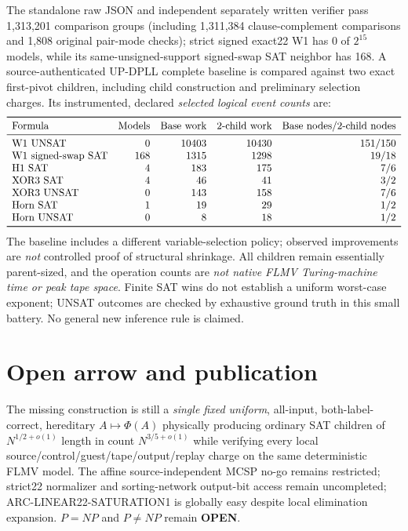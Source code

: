 \documentclass[11pt]{article}
\newcommand{\OPEN}{\textbf{OPEN}}
\begin{document}
The standalone raw JSON and independent separately written verifier pass 1,313,201 comparison groups (including 1,311,384 clause-complement comparisons and 1,808 original pair-mode checks); strict signed exact22 W1 has 0 of $2^{15}$ models, while its same-unsigned-support signed-swap SAT neighbor has 168. A source-authenticated UP-DPLL complete baseline is compared against two exact first-pivot children, including child construction and preliminary selection charges. Its instrumented, declared \emph{selected logical event counts} are:
\[
\begin{array}{lrrrr}
\toprule
\text{Formula}&\text{Models}&\text{Base work}&\text{2-child work}&\text{Base nodes/2-child nodes}\\\midrule
\text{W1 UNSAT}&0&10403&10430&151/150\\
\text{W1 signed-swap SAT}&168&1315&1298&19/18\\
\text{H1 SAT}&4&183&175&7/6\\
\text{XOR3 SAT}&4&46&41&3/2\\
\text{XOR3 UNSAT}&0&143&158&7/6\\
\text{Horn SAT}&1&19&29&1/2\\
\text{Horn UNSAT}&0&8&18&1/2\\
\bottomrule
\end{array}
\]
The baseline includes a different variable-selection policy; observed improvements are \emph{not} controlled proof of structural shrinkage. All children remain essentially parent-sized, and the operation counts are \emph{not native FLMV Turing-machine time or peak tape space}. Finite SAT wins do not establish a uniform worst-case exponent; UNSAT outcomes are checked by exhaustive ground truth in this small battery. No general new inference rule is claimed.

\section{Open arrow and publication}
The missing construction is still a \emph{single fixed uniform}, all-input, both-label-correct, hereditary $A\mapsto\Phi(A)$ physically producing ordinary SAT children of $N^{1/2+o(1)}$ length in count $N^{3/5+o(1)}$ while verifying every local source/control/guest/tape/output/replay charge on the same deterministic FLMV model. The affine source-independent MCSP no-go remains restricted; strict22 normalizer and sorting-network output-bit access remain uncompleted; ARC-LINEAR22-SATURATION1 is globally easy despite local elimination expansion. $P=NP$ and $P\ne NP$ remain \OPEN.
\end{document}
